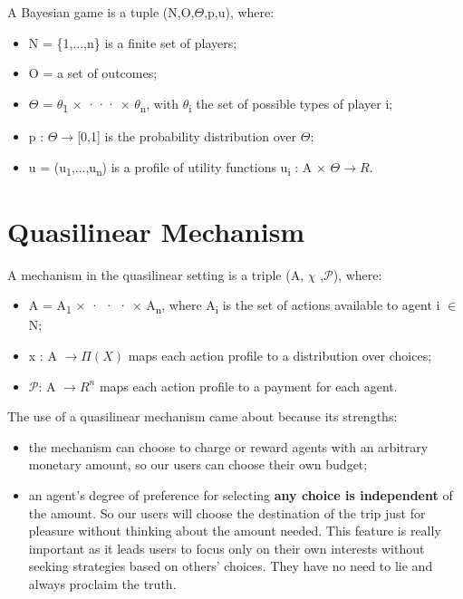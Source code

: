 \documentclass[12pt]{article}
\begin{document}
A Bayesian game is a tuple (N,O,$\Theta$,p,u), where:
\begin{itemize}
    \item N = \{1,...,n\} is a finite set of players; \\
    \item O = a set of outcomes;\\
    \item $\Theta$ = $\theta$\textsubscript{1} × ··· × $\theta$\textsubscript{n}, with $\theta$\textsubscript{i} the set of possible types of player i; \\
    \item p : $\Theta$$\rightarrow$[0,1] is the probability distribution over $\Theta$; \\
    \item u = (u\textsubscript{1},...,u\textsubscript{n}) is a profile of utility functions u\textsubscript{i} : A × $\Theta \rightarrow R$. 
\end{itemize}

\section{Quasilinear Mechanism}
A mechanism in the quasilinear setting is a triple (A, $\chi$ ,$\mathcal{P}$), where:
\begin{itemize}
    
    \item  A = A\textsubscript{1} × · · · × A\textsubscript{n}, where A\textsubscript{i} is the set of actions available to agent i $\in$ N;

    \item x : A $\rightarrow \Pi(X)$ maps each action profile to a distribution over choices;
    
     \item  $\mathcal{P}$: A $\rightarrow R ^{n}$ maps each action profile to a payment for each agent.
     
 \end{itemize}
 The use of a quasilinear mechanism came about because its strengths:
\begin{itemize}
\item the mechanism can choose to charge or reward agents with an arbitrary monetary amount, so our users can choose their own budget;

\item an agent's degree of preference for selecting \textbf{any choice is independent} of the amount.
So our users will choose the destination of the trip just for pleasure without thinking about the amount needed.  
This feature is really important as it leads users to focus only on their own interests without seeking strategies based on others' choices. They have no need to lie and always proclaim the truth.
\end{itemize}
\end{document}
